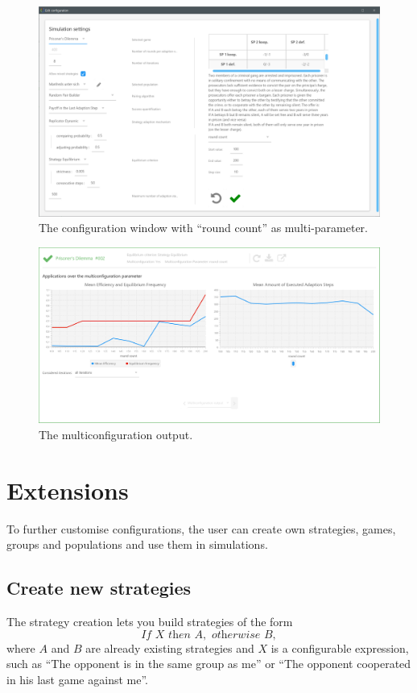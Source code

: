 \documentclass[parskip=full,11pt]{scrartcl}
\begin{document}
\begin{figure}
	\centering
	\includegraphics[width=0.7\linewidth]{img_manual/multiparam_configwindow.PNG}
	\caption{The configuration window with \enquote{round count} as multi-parameter.}
	\label{fig:multi_config}
\end{figure}

\begin{figure}
	\centering
	\includegraphics[width=0.7\linewidth]{img_manual/Multiconfiguration_output.PNG}
	\caption{The multiconfiguration output.}
	\label{fig:multi_ouput}
\end{figure}

\pagebreak
\section{Extensions}

To further customise configurations, the user can create own strategies, games, groups and populations and use them in simulations.

\subsection{Create new strategies}
The strategy creation lets you build strategies of the form
\begin{equation}
\textit{If } X \textit{ then } A, \textit{ otherwise } B,
\end{equation}\label{eq:strategy}
where \(A\) and \(B\) are already existing strategies and \(X\) is a configurable expression, such as \enquote{The opponent is in the same group as me} or \enquote{The opponent cooperated in his last game against me}.
\end{document}
